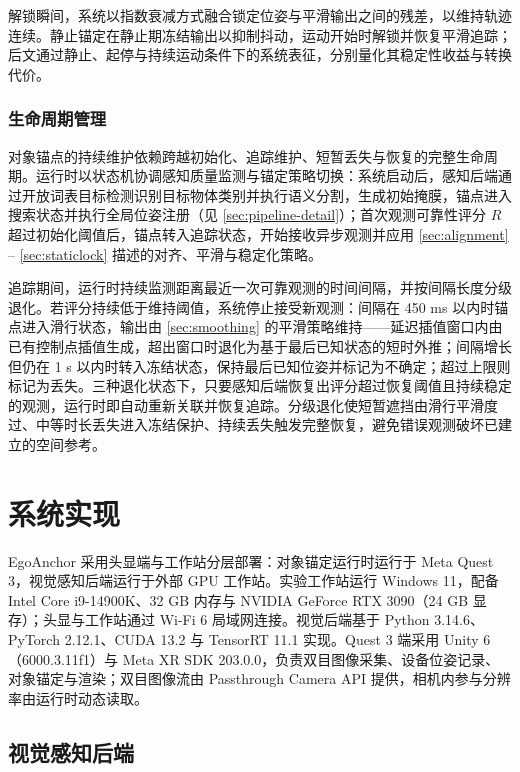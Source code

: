 \documentclass[review]{vgtc}
\begin{document}
解锁瞬间，系统以指数衰减方式融合锁定位姿与平滑输出之间的残差，以维持轨迹连续。静止锚定在静止期冻结输出以抑制抖动，运动开始时解锁并恢复平滑追踪；后文通过静止、起停与持续运动条件下的系统表征，分别量化其稳定性收益与转换代价。

\subsubsection{生命周期管理}\label{sec:lifecycle}


对象锚点的持续维护依赖跨越初始化、追踪维护、短暂丢失与恢复的完整生命周期。运行时以状态机协调感知质量监测与锚定策略切换：系统启动后，感知后端通过开放词表目标检测识别目标物体类别并执行语义分割，生成初始掩膜，锚点进入搜索状态并执行全局位姿注册（见 \ref{sec:pipeline-detail}）；首次观测可靠性评分 $R$ 超过初始化阈值后，锚点转入追踪状态，开始接收异步观测并应用 \ref{sec:alignment} -- \ref{sec:staticlock} 描述的对齐、平滑与稳定化策略。

追踪期间，运行时持续监测距离最近一次可靠观测的时间间隔，并按间隔长度分级退化。若评分持续低于维持阈值，系统停止接受新观测：间隔在 450 ms 以内时锚点进入滑行状态，输出由 \ref{sec:smoothing} 的平滑策略维持------延迟插值窗口内由已有控制点插值生成，超出窗口时退化为基于最后已知状态的短时外推；间隔增长但仍在 1 s 以内时转入冻结状态，保持最后已知位姿并标记为不确定；超过上限则标记为丢失。三种退化状态下，只要感知后端恢复出评分超过恢复阈值且持续稳定的观测，运行时即自动重新关联并恢复追踪。分级退化使短暂遮挡由滑行平滑度过、中等时长丢失进入冻结保护、持续丢失触发完整恢复，避免错误观测破坏已建立的空间参考。

\section{系统实现}\label{sec:impl}


EgoAnchor 采用头显端与工作站分层部署：对象锚定运行时运行于 Meta Quest 3，视觉感知后端运行于外部 GPU 工作站。实验工作站运行 Windows 11，配备 Intel Core i9-14900K、32 GB 内存与 NVIDIA GeForce RTX 3090（24 GB 显存）；头显与工作站通过 Wi-Fi 6 局域网连接。视觉后端基于 Python 3.14.6、PyTorch 2.12.1、CUDA 13.2 与 TensorRT 11.1 实现。Quest 3 端采用 Unity 6（6000.3.11f1）与 Meta XR SDK 203.0.0，负责双目图像采集、设备位姿记录、对象锚定与渲染；双目图像流由 Passthrough Camera API 提供，相机内参与分辨率由运行时动态读取。

\subsection{视觉感知后端}
\end{document}
